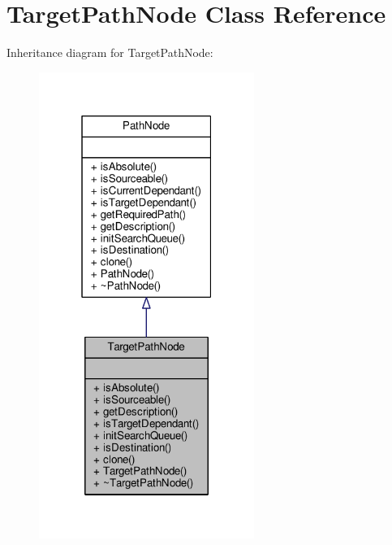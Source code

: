 \hypertarget{classTargetPathNode}{}\section{Target\+Path\+Node Class Reference}
\label{classTargetPathNode}


Inheritance diagram for Target\+Path\+Node\+:
\nopagebreak
\begin{figure}[H]
\begin{center}
\leavevmode
\includegraphics[width=199pt]{d4/d3f/classTargetPathNode__inherit__graph}
\end{center}
\end{figure}


